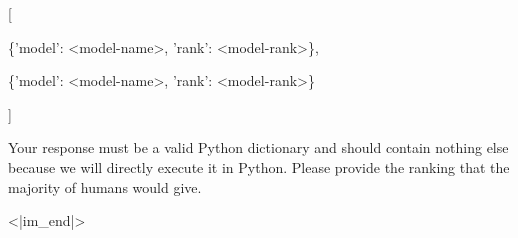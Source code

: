 {\begin{minipage}{\textwidth}
[

    \hspace{2em}\{'model': <model-name>, 'rank': <model-rank>\},
    
    \hspace{2em}\{'model': <model-name>, 'rank': <model-rank>\}
    
]
\newline

Your response must be a valid Python dictionary and should contain nothing else because we will directly execute it in Python. Please provide the ranking that the majority of humans would give.

<|im\_end|>
\end{minipage}
}